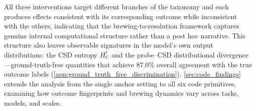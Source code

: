 All three interventions target different branches of the taxonomy and each produces effects consistent with its corresponding outcome while inconsistent with the others, indicating that the brewing-to-resolution framework captures genuine internal computational structure rather than a post hoc narrative.
%
This structure also leaves observable signatures in the model's own output distributions: the CSD entropy $H_{\mathrm{C}}^\ell$ and the probe--CSD distributional divergence---ground-truth-free quantities that achieve 87.0\% overall agreement with the true outcome labels (\cref{app:ground_truth_free_discrimination}). \cref{sec:code_findings} extends the analysis from the single anchor setting to all six code primitives, examining how outcome fingerprints and brewing dynamics vary across tasks, models, and scales.
